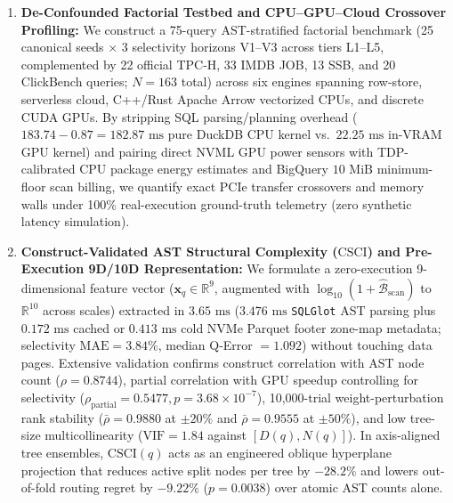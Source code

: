 \documentclass[10pt,a4paper]{article}
\begin{document}
\begin{enumerate}
    \item \textbf{De-Confounded Factorial Testbed and CPU--GPU--Cloud Crossover Profiling:} We construct a 75-query AST-stratified factorial benchmark (25 canonical seeds $\times$ 3 selectivity horizons V1--V3 across tiers L1--L5, complemented by 22 official TPC-H, 33 IMDB JOB, 13 SSB, and 20 ClickBench queries; $N=163$ total) across six engines spanning row-store, serverless cloud, C++/Rust Apache Arrow vectorized CPUs, and discrete CUDA GPUs. By stripping SQL parsing/planning overhead ($183.74 - 0.87 = 182.87\text{ ms}$ pure DuckDB CPU kernel vs.\ $22.25\text{ ms}$ in-VRAM GPU kernel) and pairing direct NVML GPU power sensors with TDP-calibrated CPU package energy estimates and BigQuery $10\text{ MiB}$ minimum-floor scan billing, we quantify exact PCIe transfer crossovers and memory walls under 100\% real-execution ground-truth telemetry (zero synthetic latency simulation).

    \item \textbf{Construct-Validated AST Structural Complexity ($\text{CSCI}$) and Pre-Execution 9D/10D Representation:} We formulate a zero-execution 9-dimensional feature vector ($\mathbf{x}_q \in \mathbb{R}^9$, augmented with $\log_{10}(1+\hat{\mathcal{B}}_{\text{scan}})$ to $\mathbb{R}^{10}$ across scales) extracted in $3.65\text{ ms}$ ($3.476\text{ ms}$ \texttt{SQLGlot} AST parsing plus $0.172\text{ ms}$ cached or $0.413\text{ ms}$ cold NVMe Parquet footer zone-map metadata; selectivity $\text{MAE}=3.84\%$, median Q-Error $=1.092$) without touching data pages. Extensive validation confirms construct correlation with AST node count ($\rho=0.8744$), partial correlation with GPU speedup controlling for selectivity ($\rho_{\text{partial}}=0.5477, p=3.68\times 10^{-7}$), 10,000-trial weight-perturbation rank stability ($\bar{\rho}=0.9880$ at $\pm 20\%$ and $\bar{\rho}=0.9555$ at $\pm 50\%$), and low tree-size multicollinearity ($\text{VIF}=1.84$ against $[D(q), N(q)]$). In axis-aligned tree ensembles, $\text{CSCI}(q)$ acts as an engineered oblique hyperplane projection that reduces active split nodes per tree by $-28.2\%$ and lowers out-of-fold routing regret by $-9.22\%$ ($p=0.0038$) over atomic AST counts alone.


\end{enumerate}
\end{document}
